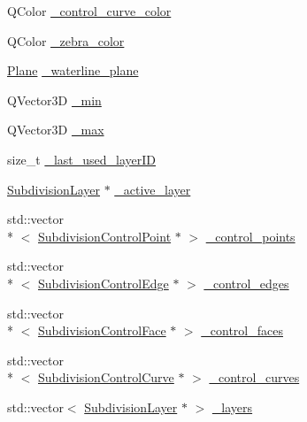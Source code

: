 \begin{DoxyCompactItemize}
\item 
Q\-Color \hyperlink{classShipCAD_1_1SubdivisionSurface_af0385bc183e805c1adc23750747a43d7}{\-\_\-control\-\_\-curve\-\_\-color}
\item 
Q\-Color \hyperlink{classShipCAD_1_1SubdivisionSurface_a047d5d0575c944d216ada589e30ee3bd}{\-\_\-zebra\-\_\-color}
\item 
\hyperlink{classShipCAD_1_1Plane}{Plane} \hyperlink{classShipCAD_1_1SubdivisionSurface_a762de21a330588c7bfbe081637cab2f3}{\-\_\-waterline\-\_\-plane}
\item 
Q\-Vector3\-D \hyperlink{classShipCAD_1_1SubdivisionSurface_ae1d7164e7bdcebc2584a54f466495053}{\-\_\-min}
\item 
Q\-Vector3\-D \hyperlink{classShipCAD_1_1SubdivisionSurface_a9b21a31f620de3b73100ca83d76002b7}{\-\_\-max}
\item 
size\-\_\-t \hyperlink{classShipCAD_1_1SubdivisionSurface_a0ba5c4e08110400890eb60140f3e2058}{\-\_\-last\-\_\-used\-\_\-layer\-I\-D}
\item 
\hyperlink{classShipCAD_1_1SubdivisionLayer}{Subdivision\-Layer} $\ast$ \hyperlink{classShipCAD_1_1SubdivisionSurface_aef766e0b62189247c0f3214c56800040}{\-\_\-active\-\_\-layer}
\item 
std\-::vector\\*
$<$ \hyperlink{classShipCAD_1_1SubdivisionControlPoint}{Subdivision\-Control\-Point} $\ast$ $>$ \hyperlink{classShipCAD_1_1SubdivisionSurface_a906d5981dc482ede1bb3c7256e750945}{\-\_\-control\-\_\-points}
\item 
std\-::vector\\*
$<$ \hyperlink{classShipCAD_1_1SubdivisionControlEdge}{Subdivision\-Control\-Edge} $\ast$ $>$ \hyperlink{classShipCAD_1_1SubdivisionSurface_ac6b2950f05e07f5a7814b278a9dc1513}{\-\_\-control\-\_\-edges}
\item 
std\-::vector\\*
$<$ \hyperlink{classShipCAD_1_1SubdivisionControlFace}{Subdivision\-Control\-Face} $\ast$ $>$ \hyperlink{classShipCAD_1_1SubdivisionSurface_a69c240904f61f8181a57559d4fa548c0}{\-\_\-control\-\_\-faces}
\item 
std\-::vector\\*
$<$ \hyperlink{classShipCAD_1_1SubdivisionControlCurve}{Subdivision\-Control\-Curve} $\ast$ $>$ \hyperlink{classShipCAD_1_1SubdivisionSurface_a72da0f8a60e186e10b88f48950a490e9}{\-\_\-control\-\_\-curves}
\item 
std\-::vector$<$ \hyperlink{classShipCAD_1_1SubdivisionLayer}{Subdivision\-Layer} $\ast$ $>$ \hyperlink{classShipCAD_1_1SubdivisionSurface_a87c6c8b63f203d788b8f4b361c814c96}{\-\_\-layers}

\end{DoxyCompactItemize}
